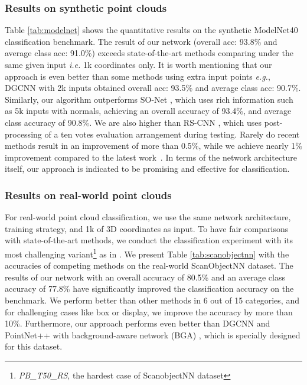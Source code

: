 \documentclass[journal,twoside]{IEEEtran}
\newcommand{\latinphrase}[1]{\textit{#1}}
\newcommand{\ie}{\latinphrase{i.e.}\xspace}
\newcommand{\eg}{\latinphrase{e.g.}\xspace}
\begin{document}
\subsubsection{Results on synthetic point clouds}
Table \ref{tab:modelnet} shows the quantitative results on the synthetic ModelNet40 classification benchmark. The result of our network (overall acc: 93.8\% and average class acc: 91.0\%) exceeds state-of-the-art methods comparing under the same given input \ie 1k coordinates only. It is worth mentioning that our approach is even better than some methods using extra input points \eg, DGCNN \cite{wang2019dynamic} with 2k inputs obtained overall acc: 93.5\% and average class acc: 90.7\%. Similarly, our algorithm outperforms SO-Net \cite{li2018so}, which uses rich information such as 5k inputs with normals, achieving an overall accuracy of 93.4\%, and average class accuracy of 90.8\%.  We are also higher than RS-CNN \cite{liu2019relation}, which uses post-processing of a ten votes evaluation arrangement during testing. Rarely do recent methods result in an improvement of more than 0.5\%, while we achieve nearly 1\% improvement compared to the latest work~\cite{Yan_2020_CVPR}. In terms of the network architecture itself, our approach is indicated to be promising and effective for classification.

\subsubsection{Results on real-world point clouds}
For real-world point cloud classification, we use the same network architecture, training strategy, and 1k of 3D coordinates as input. To have fair comparisons with state-of-the-art methods, we conduct the classification experiment with its most challenging variant\footnote{\emph{PB\_T50\_RS}, the hardest case of ScanobjectNN dataset} as in \cite{Uy_2019_ICCV}. We present Table \ref{tab:scanobjectnn} with the accuracies of competing methods on the real-world ScanObjectNN dataset. The results of our network with an overall accuracy of 80.5\% and an average class accuracy of 77.8\% have significantly improved the classification accuracy on the benchmark. We perform better than other methods in 6 out of 15 categories, and for challenging cases like box or display, we improve the accuracy by more than 10\%. Furthermore, our approach performs even better than DGCNN \cite{wang2019dynamic} and PointNet++ \cite{qi2017pointnet++} with background-aware network (BGA) \cite{Uy_2019_ICCV} , which is specially designed for this dataset.
\end{document}
